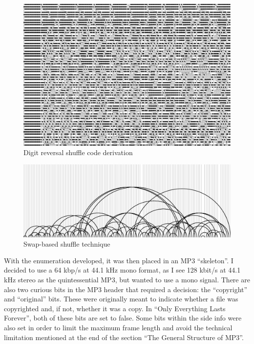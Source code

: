 \documentclass{thesis}
\begin{document}
\begin{figure}
	\begin{center}
		\includegraphics[scale=.5, angle=90]{graphics/enumeration-diagram.pdf}
		\caption{Digit reversal shuffle code derivation}
		\label{enumeration-diagram}
	\end{center}
\end{figure}

\begin{figure}
	\begin{center}
		\includegraphics[scale=.5]{graphics/actual-arcs.pdf}
		\caption{Swap-based shuffle technique}
		\label{swap-shuffle}
	\end{center}
\end{figure}

With the enumeration developed, it was then placed in an MP3 ``skeleton''. I decided to use a 64 kbp/s at 44.1 kHz mono format, as I see 128 kbit/s at 44.1 kHz stereo as the quintessential MP3, but wanted to use a mono signal. There are also two curious bits in the MP3 header that required a decision: the ``copyright'' and ``original'' bits. These were originally meant to indicate whether a file was copyrighted and, if not, whether it was a copy. In ``Only Everything Lasts Forever'', both of these bits are set to false. Some bits within the side info were also set in order to limit the maximum frame length and avoid the technical limitation mentioned at the end of the section ``The General Structure of MP3''.
\end{document}
